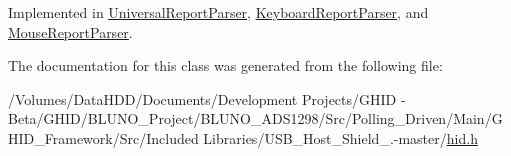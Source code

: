 \-Implemented in \hyperlink{class_universal_report_parser_a7b88d36949e3823cd80b3c7cece3d67e}{\-Universal\-Report\-Parser}, \hyperlink{class_keyboard_report_parser_a60d8d4d4d187ce5c0e0d69aee7cc772f}{\-Keyboard\-Report\-Parser}, and \hyperlink{class_mouse_report_parser_a2dd4e0add7c902300de5e7250c6d6110}{\-Mouse\-Report\-Parser}.



\-The documentation for this class was generated from the following file\-:\begin{DoxyCompactItemize}
\item 
/\-Volumes/\-Data\-H\-D\-D/\-Documents/\-Development Projects/\-G\-H\-I\-D -\/ Beta/\-G\-H\-I\-D/\-B\-L\-U\-N\-O\-\_\-\-Project/\-B\-L\-U\-N\-O\-\_\-\-A\-D\-S1298/\-Src/\-Polling\-\_\-\-Driven/\-Main/\-G\-H\-I\-D\-\_\-\-Framework/\-Src/\-Included Libraries/\-U\-S\-B\-\_\-\-Host\-\_\-\-Shield\-\_.-\/master/\hyperlink{hid_8h}{hid.\-h}\end{DoxyCompactItemize}
